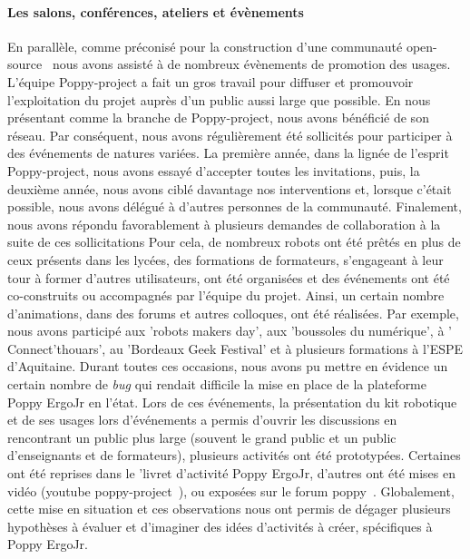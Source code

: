         \paragraph{Les salons, conférences, ateliers et évènements}
            En parallèle, comme préconisé pour la construction d'une communauté open-source~ nous avons assisté à de nombreux évènements de promotion des usages.
            L'équipe Poppy-project a fait un gros travail pour diffuser et promouvoir l’exploitation du projet auprès d’un public aussi large que possible. En nous présentant comme la branche  de Poppy-project, nous avons bénéficié de son réseau. Par conséquent, nous avons régulièrement été sollicités pour participer à des événements de natures variées. La première année, dans la lignée de l'esprit Poppy-project, nous avons essayé d'accepter toutes les invitations, puis, la deuxième année, nous avons ciblé davantage nos interventions et, lorsque c’était possible, nous avons délégué à d'autres personnes de la communauté.
            Finalement, nous avons répondu favorablement à plusieurs demandes de collaboration à la suite de ces sollicitations %
            Pour cela, de nombreux robots ont été prêtés en plus de ceux présents dans les lycées, des formations de formateurs, s’engageant à leur tour à former d’autres utilisateurs, ont été organisées et des événements ont été co-construits ou accompagnés par l’équipe du projet.
            Ainsi, un certain nombre d'animations, dans des forums et autres colloques, ont été réalisées. Par exemple, nous avons participé aux 'robots makers day', aux 'boussoles du numérique', à ' Connect'thouars', au 'Bordeaux Geek Festival' et à plusieurs formations à l'ESPE d'Aquitaine. %
            Durant toutes ces occasions, nous avons pu mettre en évidence un certain nombre de \textit{bug} qui rendait difficile la mise en place de la plateforme Poppy ErgoJr en l'état. Lors de ces événements, la présentation du kit robotique et de ses usages lors d'événements a permis d'ouvrir les discussions en rencontrant un public plus large (souvent le grand public et un public d'enseignants et de formateurs), plusieurs activités ont été prototypées. Certaines ont été reprises dans le 'livret d'activité Poppy ErgoJr, d'autres ont été mises en vidéo (\cf youtube poppy-project~), ou exposées sur le forum poppy~. Globalement, cette mise en situation et ces observations nous ont permis de dégager plusieurs hypothèses à évaluer et d'imaginer des idées d'activités à créer, spécifiques à Poppy ErgoJr.
